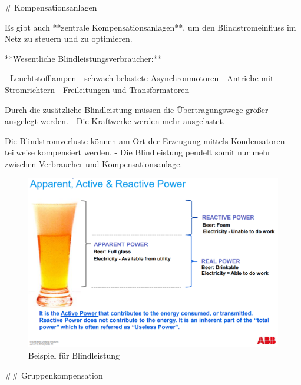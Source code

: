 \begin{markdown}
# Kompensationsanlagen


Es gibt auch **zentrale Kompensationsanlagen**, um den Blindstromeinfluss im Netz zu steuern und zu optimieren.

**Wesentliche Blindleistungsverbraucher:**

- Leuchtstofflampen
- schwach belastete Asynchronmotoren
- Antriebe mit Stromrichtern
- Freileitungen und Transformatoren

Durch die zusätzliche Blindleistung müssen die Übertragungswege größer ausgelegt werden. - Die Kraftwerke werden mehr ausgelastet.

Die Blindstromverluste können am Ort der Erzeugung mittels Kondensatoren teilweise kompensiert werden. - Die Blindleistung pendelt somit nur mehr zwischen Verbraucher und Kompensationsanlage.

\vspace{2em}

\begin{figure}[H]
    \centering
    \includegraphics[width=\linewidth]{./images/11-Kompensationsanlagen/Reactive-Power-Compensation-ABB.png}
    \caption[Beispiel für Blindleistung]{Beispiel für Blindleistung}
\end{figure}

\newpage

## Gruppenkompensation



\end{markdown}
